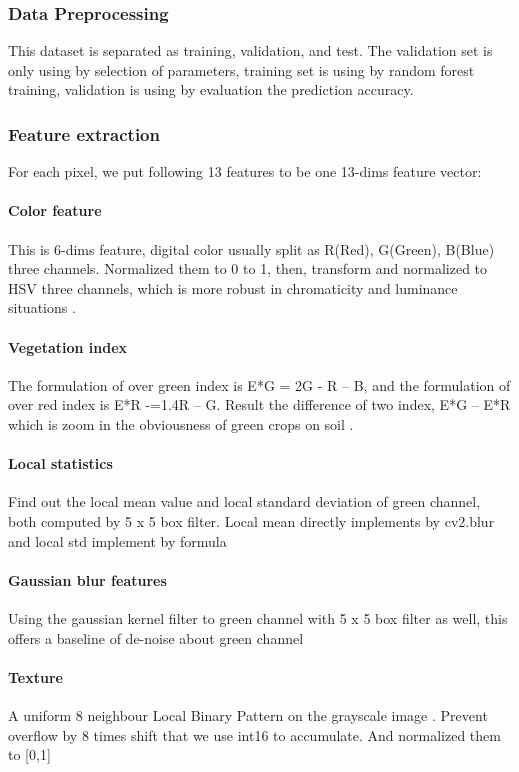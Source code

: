 \documentclass[conference]{IEEEtran}
\begin{document}
\subsubsection{Data Preprocessing}
This dataset is separated as training, validation, and test. The validation set is only using by selection of parameters, training set is using by random forest training, validation is using by evaluation the prediction accuracy. 
\subsubsection{Feature extraction}
For each pixel, we put following 13 features to be one 13-dims feature vector:
\paragraph{Color feature}
This is 6-dims feature, digital color usually split as R(Red), G(Green), B(Blue) three channels. Normalized them to 0 to 1, then, transform and normalized to HSV three channels, which is more robust in chromaticity and luminance situations \cite{opencv}.
\paragraph{Vegetation index}
The formulation of over green index is E*G = 2G - R – B, and the formulation of over red index is E*R -=1.4R – G. Result the difference of two index, E*G – E*R which is zoom in the obviousness of green crops on soil \cite{exg,veg_index}.
\paragraph{Local statistics}
Find out the local mean value and local standard deviation of green channel, both computed by 5 x 5 box filter. Local mean directly implements by cv2.blur and local std implement by formula 
\paragraph{Gaussian blur features}
Using the gaussian kernel filter to green channel with 5 x 5 box filter as well, this offers a baseline of de-noise about green channel
\paragraph{Texture}
A uniform 8 neighbour Local Binary Pattern on the grayscale image \cite{lbp}.
Prevent overflow by 8 times shift that we use int16 to accumulate. And normalized them to [0,1]
\end{document}
